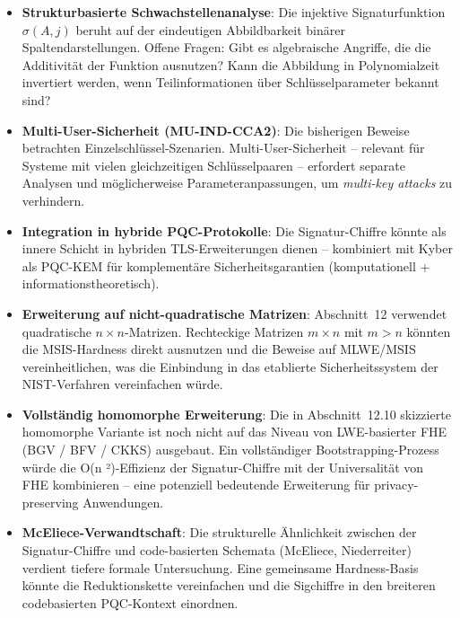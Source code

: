 ﻿\documentclass[a4paper,12pt]{article}
\theoremstyle{definition}
\begin{document}
\begin{itemize}
  \item \textbf{Strukturbasierte Schwachstellenanalyse}:
    Die injektive Signaturfunktion $\sigma(A,j)$ beruht auf der
    eindeutigen Abbildbarkeit binärer Spaltendarstellungen.
    Offene Fragen: Gibt es algebraische Angriffe, die die
    Additivität der Funktion ausnutzen? Kann die Abbildung in
    Polynomialzeit invertiert werden, wenn Teilinformationen
    über Schlüsselparameter bekannt sind?
  \item \textbf{Multi-User-Sicherheit (MU-IND-CCA2)}:
    Die bisherigen Beweise betrachten Einzelschlüssel-Szenarien.
    Multi-User-Sicherheit -- relevant für Systeme mit vielen
    gleichzeitigen Schlüsselpaaren -- erfordert separate Analysen
    und möglicherweise Parameteranpassungen, um \emph{multi-key attacks}
    zu verhindern.
  \item \textbf{Integration in hybride PQC-Protokolle}:
    Die Signatur-Chiffre könnte als innere Schicht in hybriden
    TLS-Erweiterungen dienen -- kombiniert mit Kyber als PQC-KEM
    für komplementäre Sicherheitsgarantien
    (komputationell + informationstheoretisch).
  \item \textbf{Erweiterung auf nicht-quadratische Matrizen}:
    Abschnitt~12 verwendet quadratische $n \times n$-Matrizen.
    Rechteckige Matrizen $m \times n$ mit $m > n$ könnten die
    MSIS-Hardness direkt ausnutzen und die Beweise auf MLWE/MSIS
    vereinheitlichen, was die Einbindung in das etablierte
    Sicherheitssystem der NIST-Verfahren vereinfachen würde.
  \item \textbf{Vollständig homomorphe Erweiterung}:
    Die in Abschnitt~12.10 skizzierte homomorphe Variante
    ist noch nicht auf das Niveau von LWE-basierter FHE
    (BGV / BFV / CKKS) ausgebaut. Ein vollständiger Bootstrapping-Prozess
    würde die O(n ²)-Effizienz der Signatur-Chiffre
    mit der Universalität von FHE kombinieren -- eine
    potenziell bedeutende Erweiterung für privacy-preserving
    Anwendungen.
  \item \textbf{McEliece-Verwandtschaft}:
    Die strukturelle Ähnlichkeit zwischen der Signatur-Chiffre
    und code-basierten Schemata (McEliece, Niederreiter) verdient
    tiefere formale Untersuchung. Eine gemeinsame Hardness-Basis
    könnte die Reduktionskette vereinfachen und die Sigchiffre in
    den breiteren codebasierten PQC-Kontext einordnen.
\end{itemize}

\end{document}
